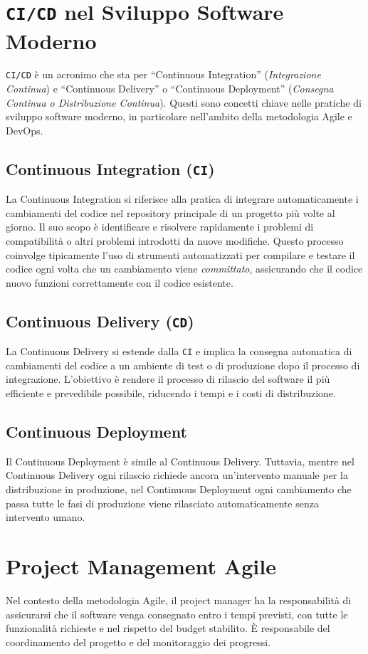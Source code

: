 \section{\texttt{CI/CD} nel Sviluppo Software Moderno}

\texttt{CI/CD} è un acronimo che sta per ``Continuous Integration'' (\textit{Integrazione Continua})
e ``Continuous Delivery'' o ``Continuous Deployment'' (\textit{Consegna Continua o Distribuzione Continua}). Questi sono concetti chiave nelle pratiche di
sviluppo software moderno, in particolare nell'ambito della metodologia Agile e DevOps.

\subsection{Continuous Integration (\texttt{CI})}
La Continuous Integration si riferisce alla pratica di integrare automaticamente i cambiamenti del codice nel repository principale di un progetto
più volte al giorno. Il suo scopo è identificare e risolvere rapidamente i problemi di compatibilità o altri problemi introdotti da nuove modifiche.
Questo processo coinvolge tipicamente l'uso di strumenti automatizzati per compilare e testare il codice ogni volta che un cambiamento viene \textit{committato},
assicurando che il codice nuovo funzioni correttamente con il codice esistente.

\subsection{Continuous Delivery (\texttt{CD})}
La Continuous Delivery si estende dalla \texttt{CI} e implica la consegna automatica di cambiamenti del codice a un ambiente di test o di produzione dopo il
processo di integrazione. L'obiettivo è rendere il processo di rilascio del software il più efficiente e prevedibile possibile, riducendo i tempi
e i costi di distribuzione.

\subsection{Continuous Deployment}
Il Continuous Deployment è simile al Continuous Delivery. Tuttavia, mentre nel Continuous Delivery ogni rilascio richiede ancora un'intervento
manuale per la distribuzione in produzione, nel Continuous Deployment ogni cambiamento che passa tutte le fasi di produzione viene rilasciato
automaticamente senza intervento umano.

\section{Project Management Agile}
Nel contesto della metodologia Agile, il project manager ha la responsabilità di assicurarsi che il software venga consegnato entro i tempi
previsti, con tutte le funzionalità richieste e nel rispetto del budget stabilito. È responsabile del coordinamento del progetto e del
monitoraggio dei progressi.

